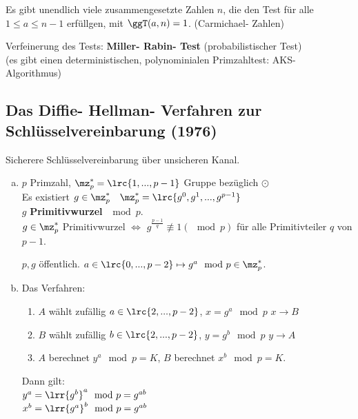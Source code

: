     Es gibt unendlich viele zusammengesetzte Zahlen $n$, die den Test für alle
    $1\leq a\leq n-1$ erfüllgen, mit $\ggT(a,n)=1$. (Carmichael- Zahlen)

    Verfeinerung des Tests: \textbf{Miller- Rabin- Test} (probabilistischer
    Test)\\
    (es gibt einen deterministischen, polynominialen Primzahltest: AKS-
    Algorithmus)

  \subsection{Das Diffie- Hellman- Verfahren zur Schlüsselvereinbarung (1976)}
    Sicherere Schlüsselvereinbarung über unsicheren Kanal.
    \begin{enumerate}[a)]
      \item $p$ Primzahl, $\mz_p^*=\lrc{1,...,p-1}$ Gruppe bezüglich $\odot$\\
        Es existiert $g\in\mz_p^*\quad \mz_p^*=\lrc{g^0,g^1,...,g^{p-1}}$\\
        $g$ \textbf{Primitivwurzel} $\mod p$.\\
        $g\in\mz_p^*$ Primitivwurzel $\Leftrightarrow$
        $g^{\frac{p-1}{q}}\not\equiv 1(\mod p)$ für alle Primitivteiler $q$ von
        $p-1$.

        $p,g$ öffentlich. $a\in\lrc{0,...,p-2}\mapsto g^a\mod p\in\mz_p^*$.
      \item Das Verfahren:\\
        \begin{enumerate}[1.]
          \item $A$ wählt zufällig $a\in\lrc{2,...,p-2}$, $x=g^a\mod p$ $x\rightarrow B$
          \item $B$ wählt zufällig $b\in\lrc{2,...,p-2}$, $y=g^b\mod p$ $y\rightarrow A$
          \item $A$ berechnet $y^a\mod p=K$, $B$ berechnet $x^b\mod p=K$.
        \end{enumerate}

        Dann gilt:\\
        $y^a=\lrr{g^b}^a\mod p=g^{ab}$\\
        $x^b=\lrr{g^a}^b\mod p=g^{ab}$
    \end{enumerate}
